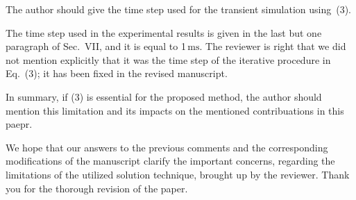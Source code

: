 \begin{reviewer}
The author should give the time step used for the transient simulation using~(3).
\end{reviewer}
\begin{authors}
The time step used in the experimental results is given in the last but one paragraph of Sec.~VII, and it is equal to 1$\,\text{ms}$.
The reviewer is right that we did not mention explicitly that it was the time step of the iterative procedure in Eq.~(3); it has been fixed in the revised manuscript.

\begin{actions}
\end{actions}
\end{authors}

\begin{reviewer}
In summary, if (3) is essential for the proposed method, the author should mention this limitation and its impacts on the mentioned contribuations in this paepr.
\end{reviewer}
\begin{authors}
We hope that our answers to the previous comments and the corresponding modifications of the manuscript clarify the important concerns, regarding the limitations of the utilized solution technique, brought up by the reviewer.
Thank you for the thorough revision of the paper.
\end{authors}
